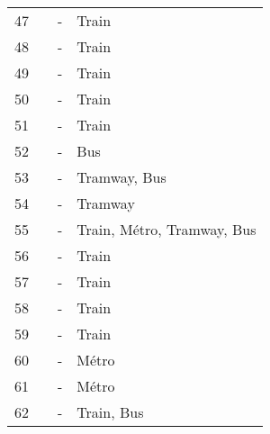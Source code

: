 \begin{longtable}{p{0.5cm}p{5.5cm}p{3cm}p{4cm}}
    \small{47} & \small{\textcite{jonkeren_bicycle_2021}}\index{Jonkeren, Olaf|pagebf} & \small{-} & \small{Train}\\
    \small{48} & \small{\textcite{jonkeren_bicycle-train_2021}}\index{Jonkeren, Olaf|pagebf} & \small{-} & \small{Train}\\
    \small{49} & \small{\textcite{kager_synergies_2017}}\index{Kager, Roland|pagebf} & \small{-} & \small{Train}\\
    \small{50} & \small{\textcite{kager_characterisation_2016}}\index{Kager, Roland|pagebf} & \small{-} & \small{Train}\\
    \small{51} & \small{\textcite{keijer_how_2000}}\index{Keijer, Majanka|pagebf} & \small{-} & \small{Train}\\
    \small{52} & \small{\textcite{krizek_bicycling_2010}}\index{Krizek, Kevin J.|pagebf} & \small{-} & \small{Bus}\\
    \small{53} & \small{\textcite{krizek_assessing_2011}}\index{Krizek, Kevin|pagebf} & \small{-} & \small{Tramway, Bus}\\
    \small{54} & \small{\textcite{krizek_detailed_2007}}\index{Krizek, Kevin J.|pagebf} & \small{-} & \small{Tramway}\\
    \small{55} & \small{\textcite{krygsman_multimodal_2004}}\index{Krygsman, Stephan|pagebf} & \small{-} & \small{Train, Métro, Tramway, Bus}\\
    \small{56} & \small{\textcite{la_paix_puello_modelling_2015}}\index{La Paix Puello, Lissy|pagebf} & \small{-} & \small{Train}\\
    \small{57} & \small{\textcite{la_paix_puello_integration_2016}}\index{La Paix Puello, Lissy|pagebf} & \small{-} & \small{Train}\\
    \small{58} & \small{\textcite{la_paix_puello_Train_2016}}\index{La Paix Puello, Lissy|pagebf} & \small{-} & \small{Train}\\
    \small{59} & \small{\textcite{la_paix_puello_role_2021}}\index{La Paix Puello, Lissy|pagebf} & \small{-} & \small{Train}\\
    \small{60} & \small{\textcite{lee_bicycle-based_2016}}\index{Lee, Jaeyeong|pagebf} & \small{-} & \small{Métro}\\
    \small{61} & \small{\textcite{lee_strategies_2010}}\index{Lee, Jaeyeong|pagebf} & \small{-} & \small{Métro}\\
    \small{62} & \small{\textcite{li_exploring_2017}}\index{Li, Wenxiang|pagebf} & \small{-} & \small{Train, Bus}\\

\end{longtable}

